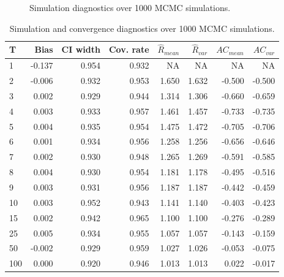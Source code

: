 \documentclass[article]{jss}
\begin{document}
\begin{figure}[h]
  \caption{Simulation diagnostics over 1000 MCMC simulations.}
    \label{fig:sim}
\end{figure}

\begin{table}[ht]
\centering
\caption{Simulation and convergence diagnostics over 1000 MCMC simulations.} 
\label{tab:results}
\begin{tabular}{lrrrrrrr}
  \hline
T & Bias & CI width & Cov. rate & $\widehat{R}_{mean}$ & $\widehat{R}_{var}$ & $AC_{mean}$ & $AC_{var}$ \\ 
  \hline
   1 & -0.137 & 0.954 & 0.932 & NA & NA & NA & NA \\ 
     2 & -0.006 & 0.932 & 0.953 & 1.650 & 1.632 & -0.500 & -0.500 \\ 
     3 & 0.002 & 0.929 & 0.944 & 1.314 & 1.306 & -0.660 & -0.659 \\ 
     4 & 0.003 & 0.933 & 0.957 & 1.461 & 1.457 & -0.733 & -0.735 \\ 
     5 & 0.004 & 0.935 & 0.954 & 1.475 & 1.472 & -0.705 & -0.706 \\ 
     6 & 0.001 & 0.934 & 0.956 & 1.258 & 1.256 & -0.656 & -0.646 \\ 
     7 & 0.002 & 0.930 & 0.948 & 1.265 & 1.269 & -0.591 & -0.585 \\ 
     8 & 0.004 & 0.930 & 0.954 & 1.181 & 1.178 & -0.495 & -0.516 \\ 
     9 & 0.003 & 0.931 & 0.956 & 1.187 & 1.187 & -0.442 & -0.459 \\ 
    10 & 0.003 & 0.952 & 0.943 & 1.141 & 1.140 & -0.403 & -0.423 \\ 
    15 & 0.002 & 0.942 & 0.965 & 1.100 & 1.100 & -0.276 & -0.289 \\ 
    25 & 0.005 & 0.934 & 0.955 & 1.057 & 1.057 & -0.143 & -0.159 \\ 
    50 & -0.002 & 0.929 & 0.959 & 1.027 & 1.026 & -0.053 & -0.075 \\ 
   100 & 0.000 & 0.920 & 0.946 & 1.013 & 1.013 & 0.022 & -0.017 \\ 
   \hline
\end{tabular}
\end{table}
\end{document}
